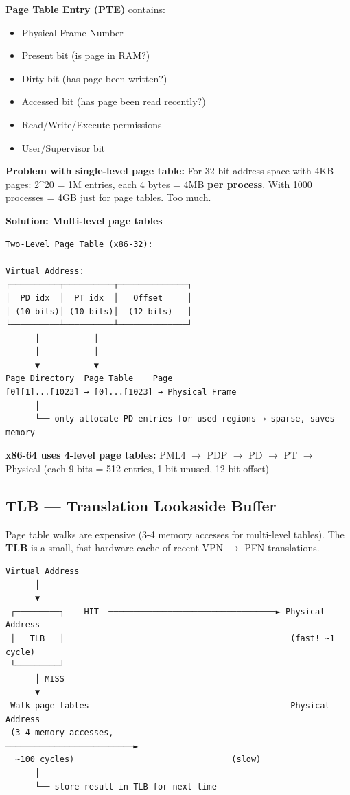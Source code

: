 \documentclass[11pt]{article}
\providecommand{\tightlist}{\setlength{\itemsep}{1pt}\setlength{\parskip}{0pt}}
\begin{document}
\textbf{Page Table Entry (PTE)} contains:

\begin{itemize}
\tightlist
\item
  Physical Frame Number
\item
  Present bit (is page in RAM?)
\item
  Dirty bit (has page been written?)
\item
  Accessed bit (has page been read recently?)
\item
  Read/Write/Execute permissions
\item
  User/Supervisor bit
\end{itemize}

\textbf{Problem with single-level page table:} For 32-bit address space with 4KB pages: 2\^{}20 = 1M entries, each 4 bytes = 4MB \textbf{per process}. With 1000 processes = 4GB just for page tables. Too much.

\textbf{Solution: Multi-level page tables}

\setcodelang{}

\begin{verbatim}
Two-Level Page Table (x86-32):

Virtual Address:
┌──────────┬──────────┬──────────────┐
│  PD idx  │  PT idx  │   Offset     │
│ (10 bits)│ (10 bits)│  (12 bits)   │
└──────────┴──────────┴──────────────┘
      │           │
      │           │
      ▼           ▼
Page Directory  Page Table    Page
[0][1]...[1023] → [0]...[1023] → Physical Frame
      │
      └── only allocate PD entries for used regions → sparse, saves memory
\end{verbatim}

\textbf{x86-64 uses 4-level page tables:} PML4 \(\rightarrow\) PDP \(\rightarrow\) PD \(\rightarrow\) PT \(\rightarrow\) Physical (each 9 bits = 512 entries, 1 bit unused, 12-bit offset)

\subsection{TLB --- Translation Lookaside Buffer}\label{tlb--translation-lookaside-buffer}

Page table walks are expensive (3-4 memory accesses for multi-level tables). The \textbf{TLB} is a small, fast hardware cache of recent VPN \(\rightarrow\) PFN translations.

\setcodelang{}

\begin{verbatim}
Virtual Address
      │
      ▼
 ┌─────────┐    HIT  ──────────────────────────────────► Physical Address
 │   TLB   │                                              (fast! ~1 cycle)
 └─────────┘
      │ MISS
      ▼
 Walk page tables                                         Physical Address
 (3-4 memory accesses,                        ──────────────────────────►
  ~100 cycles)                                (slow)
      │
      └── store result in TLB for next time
\end{verbatim}
\end{document}
